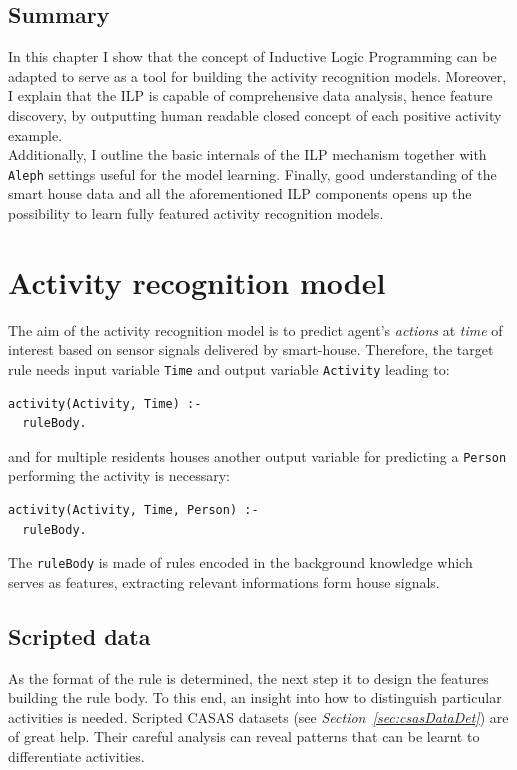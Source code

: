 \documentclass[10pt, a4paper, pdflatex, leqno, twoside, openright]{report}
\begin{document}
  \section{Summary}
In this chapter I show that the concept of Inductive Logic Programming can be adapted to serve as a tool for building the activity recognition models. Moreover, I explain that the ILP is capable of comprehensive data analysis, hence feature discovery, by outputting human readable closed concept of each positive activity example.\\
Additionally, I outline the basic internals of the ILP mechanism together with \texttt{Aleph} settings useful for the model learning. Finally, good understanding of the smart house data and all the aforementioned ILP components opens up the possibility to learn fully featured activity recognition models.

\chapter{Activity recognition model}
The aim of the activity recognition model is to predict agent's \emph{actions} at \emph{time} of interest based on sensor signals delivered by smart-house. Therefore, the target rule needs input variable \texttt{Time} and output variable \texttt{Activity} leading to:\\
\begin{verbatim}
activity(Activity, Time) :-
  ruleBody.
\end{verbatim}
and for multiple residents houses another output variable for predicting a \texttt{Person} performing the activity is necessary:\\
\begin{verbatim}
activity(Activity, Time, Person) :-
  ruleBody.
\end{verbatim}
The \texttt{ruleBody} is made of rules encoded in the background knowledge which serves as features, extracting relevant informations form house signals.

  \section{Scripted data} %
As the format of the rule is determined, the next step it to design the features building the rule body. To this end, an insight into how to distinguish particular activities is needed. Scripted CASAS datasets (see \emph{Section~\ref{sec:csasDataDet}}) are of great help. Their careful analysis can reveal patterns that can be learnt to differentiate activities.
\end{document}
